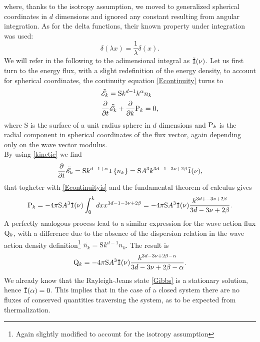 where, thanks to the isotropy assumption, we moved to generalized spherical coordinates in $d$ dimensions and ignored any constant resulting from angular integration. 
As for the delta functions, their known property under integration was used:
\begin{equation*}
    \delta(\lambda x) = \frac{1}{\lambda} \delta (x).
\end{equation*}
We will refer in the following to the adimensional integral as $\tilde{\mathtt{I}}(\nu)$. Let us first turn to the energy flux, with a slight redefinition of the energy density,
to account for spherical coordinates, the continuity equation \eqref{Econtinuity} turns to 
\begin{align}
    &\tilde{\mathscr{E}}_k = \mathrm{S}k^{d-1}k^\alpha n_k \\
    &\frac{\partial}{\partial t} \tilde{\mathscr{E}}_k + \frac{\partial}{\partial k}  \mathrm{P}_k = 0,
    \label{Econtinuityis}
\end{align}
where $\mathrm{S}$ is the surface of a unit radius sphere in $d$ dimensions and $\mathrm{P}_k$ is the radial component in spherical coordinates of the flux vector,
again depending only on the wave vector modulus.\\
By using \eqref{kinetic} we find
\begin{equation}
    \frac{\partial}{\partial t} \tilde{\mathscr{E}}_k = \mathrm{S} k^{d-1+\alpha} \mathtt{I}\left\{n_k\right\} = \mathrm{S} A^3 k^{3d-1-3\nu +2\beta} \tilde{\mathtt{I}}(\nu),
\end{equation}
that togheter with \eqref{Econtinuityis} and the fundamental theorem of calculus gives 
\begin{equation}
    \mathrm{P}_k = - 4\pi \mathrm{S} A^3 \tilde{\mathtt{I}}(\nu) \int_{0}^{k} dx x^{3d-1-3\nu +2\beta} = - 4\pi \mathrm{S} A^3 \tilde{\mathtt{I}}(\nu) 
    \frac{k^{3d+-3\nu +2\beta}}{3d-3\nu +2\beta}.
    \label{KZP}
\end{equation} 
A perfectly analogous process lead to a similar expression for the wave action flux $\mathrm{Q}_k$, with a difference due to the absence of the dispersion relation
in the wave action density definition\footnote{Again slightly modified to account for the isotropy assumption} $\tilde{n_k}=\mathrm{S}k^{d-1}n_k$. The result is
\begin{equation}
    \mathrm{Q}_k = - 4\pi \mathrm{S} A^3 \tilde{\mathtt{I}}(\nu) \frac{k^{3d-3\nu +2\beta-\alpha}}{3d-3\nu +2\beta-\alpha}.
    \label{KZQ}
\end{equation}
We already know that the Rayleigh-Jeans state \eqref{Gibbs} is a stationary solution, hence $\tilde{\mathtt{I}}(\alpha) = 0$. This implies that in the case of a closed system there are no
fluxes of conserved quantities traversing the system, as to be expected from thermalization. \\ 
